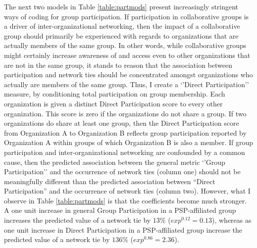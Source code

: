 \documentclass[12pt,a4paper,titlepage]{article}
\begin{document}
%



The next two models in Table \ref{table:partmods} present increasingly stringent ways of coding for group participation. If participation in collaborative groups is a driver of inter-organizational networking, then the impact of a collaborative group should primarily be experienced with regards to organizations that are actually members of the same group. In other words, while collaborative groups might certainly increase awareness of and access even to other organizations that are not in the same group, it stands to reason that the association between participation and network ties should be concentrated amongst organizations who actually are members of the same group. Thus, I create a ‘’Direct Participation’’ measure, by conditioning total participation on group membership. Each organization is given a distinct Direct Participation score to every other organization. This score is zero if the organizations do not share a group. If two organizations do share at least one group, then the Direct Participation score from Organization A to Organization B reflects group participation reported by Organization A within groups of which Organization B is also a member. If group participation and inter-organizational networking are confounded by a common cause, then the predicted association between the general metric `'Group Participation'' and the occurrence of network ties (column one) should not be meaningfully different than the predicted association between “Direct Participation” and the occurrence of network ties (column two). However, what I observe in Table \ref{table:partmods} is that the coefficients become much stronger. A one unit increase in general Group Participation in a PSP-affiliated group increases the predicted value of a network tie by $13\%$ ($exp^{0.12} = 0.13$), whereas as one unit increase in Direct Participation in a PSP-affiliated group increase the predicted value of a network tie by $136\%$ ($exp^{0.86} = 2.36$).
\end{document}
